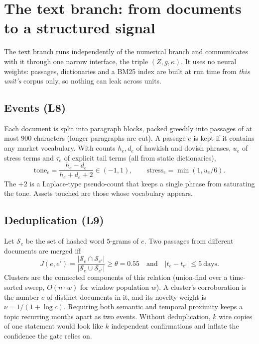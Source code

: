 \section{The text branch: from documents to a structured signal}\label{sec:text}

The text branch runs independently of the numerical branch and communicates with it through one narrow interface, the triple $(Z,g,\kappa)$. It
uses no neural weights: passages, dictionaries and a BM25 index are built at run time from \emph{this unit's} corpus only, so nothing can leak
across units.

\subsection{Events (L8)}

Each document is split into paragraph blocks, packed greedily into passages of at most $900$ characters (longer paragraphs are cut). A passage
$e$ is kept if it contains any market vocabulary. With counts $h_e,d_e$ of hawkish and dovish phrases, $u_e$ of stress terms and $\tau_e$ of
explicit tail terms (all from static dictionaries),
\begin{equation}
  \text{tone}_e=\frac{h_e-d_e}{h_e+d_e+2}\in(-1,1),\qquad \text{stress}_e=\min(1,u_e/6).
\end{equation}
The $+2$ is a Laplace-type pseudo-count that keeps a single phrase from saturating the tone. Assets touched are those whose vocabulary appears.

\subsection{Deduplication (L9)}

Let $\mathcal S_e$ be the set of hashed word $5$-grams of $e$. Two passages from different documents are merged iff
\begin{equation}
  J(e,e')=\frac{|\mathcal S_e\cap\mathcal S_{e'}|}{|\mathcal S_e\cup\mathcal S_{e'}|}\ge\theta=0.55
  \quad\text{and}\quad |t_e-t_{e'}|\le 5\ \text{days}.
\end{equation}
Clusters are the connected components of this relation (union-find over a time-sorted sweep, $O(n\cdot w)$ for window population $w$). A
cluster's corroboration is the number $c$ of distinct documents in it, and its novelty weight is $\nu=1/(1+\log c)$. Requiring both semantic and
temporal proximity keeps a topic recurring months apart as two events. Without deduplication, $k$ wire copies of one statement would look like
$k$ independent confirmations and inflate the confidence the gate relies on.

